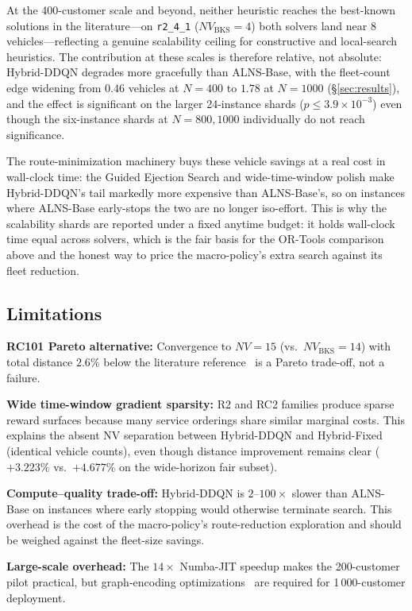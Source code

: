 \documentclass[conference]{IEEEtran}
\newcommand{\BKS}{\text{BKS}}
\begin{document}
At the 400-customer scale and beyond, neither heuristic reaches the best-known
solutions in the literature---on \texttt{r2\_4\_1} ($NV_{\BKS}=4$) both solvers
land near $8$ vehicles---reflecting a genuine scalability ceiling for
constructive and local-search heuristics. The contribution at these scales is
therefore relative, not absolute: Hybrid-DDQN degrades more gracefully than
ALNS-Base, with the fleet-count edge widening from $0.46$ vehicles at $N{=}400$
to $1.78$ at $N{=}1000$ (\S\ref{sec:results}), and the effect is significant on
the larger 24-instance shards ($p\le 3.9{\times}10^{-3}$) even though the
six-instance shards at $N{=}800,1000$ individually do not reach significance.

The route-minimization machinery buys these vehicle savings at a real cost in
wall-clock time: the Guided Ejection Search and wide-time-window polish make
Hybrid-DDQN's tail markedly more expensive than ALNS-Base's, so on instances
where ALNS-Base early-stops the two are no longer iso-effort. This is why the
scalability shards are reported under a fixed anytime budget: it holds wall-clock
time equal across solvers, which is the fair basis for the OR-Tools comparison
above and the honest way to price the macro-policy's extra search against its
fleet reduction.

\subsection{Limitations}

\textbf{RC101 Pareto alternative:}  Convergence to $NV=15$ (vs.\ $NV_{\BKS}=14$)
with total distance $2.6\%$ below the literature reference~\cite{Solomon1987} is
a Pareto trade-off, not a failure.

\textbf{Wide time-window gradient sparsity:}  R2 and RC2 families produce sparse
reward surfaces because many service orderings share similar marginal costs.
This explains the absent NV separation between Hybrid-DDQN and Hybrid-Fixed
(identical vehicle counts), even though distance improvement remains clear
($+3.223\%$ vs.\ $+4.677\%$ on the wide-horizon fair subset).

\textbf{Compute--quality trade-off:}  Hybrid-DDQN is $2$--$100{\times}$ slower
than ALNS-Base on instances where early stopping would otherwise terminate
search.  This overhead is the cost of the macro-policy's route-reduction
exploration and should be weighed against the fleet-size savings.

\textbf{Large-scale overhead:}  The $14{\times}$ Numba-JIT speedup makes the
200-customer pilot practical, but graph-encoding
optimizations~\cite{kool2019attention} are required for 1\,000-customer
deployment.
\end{document}
